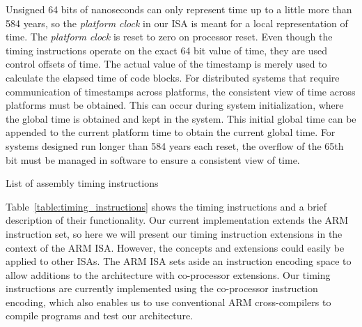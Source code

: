 Unsigned 64 bits of nanoseconds can only represent time up to a little more than 584 years, so the \emph{platform clock} in our ISA is meant for a local representation of time. 
The \emph{platform clock} is reset to zero on processor reset. 
Even though the timing instructions operate on the exact 64 bit value of time, they are used control offsets of time. 
The actual value of the timestamp is merely used to calculate the elapsed time of code blocks.
For distributed systems that require communication of timestamps across platforms, the consistent view of time across platforms must be obtained.
This can occur during system initialization, where the global time is obtained and kept in the system.  
This initial global time can be appended to the current platform time to obtain the current global time. 
For systems designed run longer than 584 years each reset, the overflow of the 65th bit must be managed in software to ensure a consistent view of time.


\begin{table}[h]
\noindent{}
\caption{List of assembly timing instructions}
\label{table:timing_instructions}
\end{table}

Table~\ref{table:timing_instructions} shows the timing instructions and a brief description of their functionality.   
Our current implementation extends the ARM~\cite{armrefman} instruction set, so here we will present our timing instruction extensions in the context of the ARM ISA.
However, the concepts and extensions could easily be applied to other ISAs. 
The ARM ISA sets aside an instruction encoding space to allow additions to the architecture with co-processor extensions. 
Our timing instructions are currently implemented using the co-processor instruction encoding, which also enables us to use conventional ARM cross-compilers to compile programs and test our architecture.     

